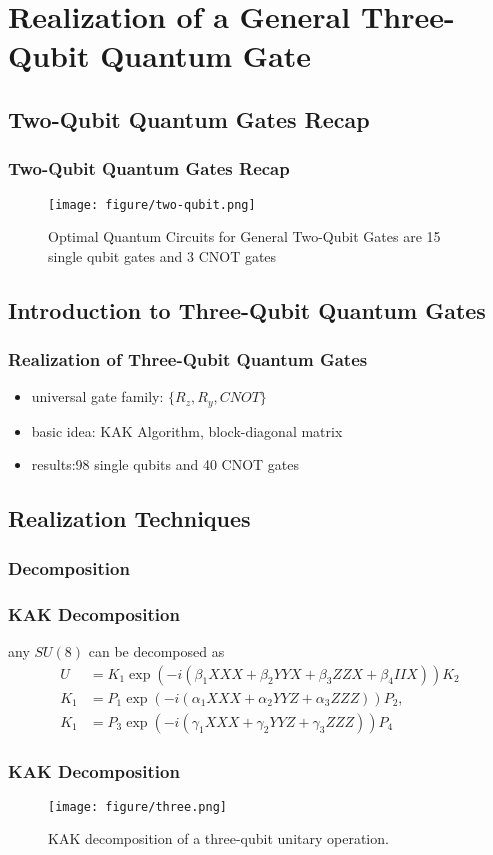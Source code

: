 \section{Realization of a General Three-Qubit Quantum Gate}
\subsection{Two-Qubit Quantum Gates Recap}
\begin{frame}
\frametitle{Two-Qubit Quantum Gates Recap}
\begin{figure}
  \texttt{[image: figure/two-qubit.png]}
  \caption{Optimal Quantum Circuits for General Two-Qubit Gates are 15 single qubit gates and 3 CNOT gates\cite{two}}
\end{figure}
\end{frame}

\subsection{Introduction to Three-Qubit Quantum Gates}
\begin{frame}
\frametitle{Realization of Three-Qubit Quantum Gates}
\begin{itemize}
  \item universal gate family: $\{R_z,R_y,CNOT\}$
  \item basic idea: KAK Algorithm\cite{kak}, block-diagonal matrix
  \item results:98 single qubits and 40 CNOT gates
\end{itemize}
\end{frame}

\subsection{Realization Techniques}
\subsubsection{Decomposition}
\begin{frame}
\frametitle{KAK Decomposition\cite{kak}}
any $SU(8)$ can be decomposed as
\begin{align}
  U&=K_{1} \exp \left(-i\left(\beta_{1} XXX+\beta_{2} YYX+\beta_{3} ZZX+\beta_{4} IIX\right)\right) K_{2}\\
  K_{1}&= P_{1}\exp \left(-i\left(\alpha_{1}XXX + \alpha_{2}YYZ + \alpha_{3}ZZZ\right)\right)P_{2},\\
  K_{1}&= P_{3}\exp \left(-i\left(\gamma_{1}XXX + \gamma_{2}YYZ + \gamma_{3}ZZZ\right)\right)P_{4}
\end{align}
\end{frame}
\begin{frame}
\frametitle{KAK Decomposition\cite{kak}}
\begin{figure}
  \texttt{[image: figure/three.png]}
  \caption{KAK decomposition of a three-qubit unitary operation.}
\end{figure}
\end{frame}

